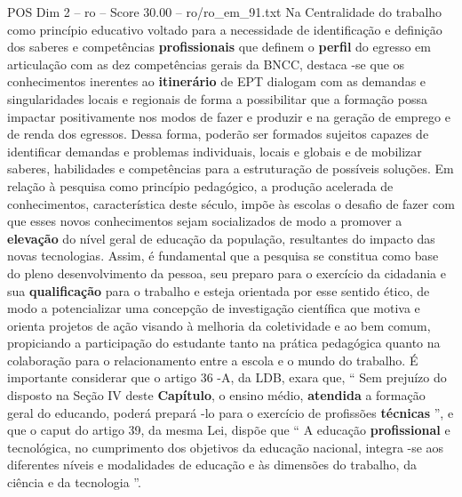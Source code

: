 \begin{textsample}{POS Dim 2 – ro – Score 30.00 – ro/ro\_em\_91.txt}
Na Centralidade do trabalho como princípio educativo voltado para a necessidade de identificação e definição dos saberes e competências \textbf{profissionais} que definem o \textbf{perfil} do egresso em articulação com as dez competências gerais da BNCC, destaca -se que os conhecimentos inerentes ao \textbf{itinerário} de EPT dialogam com as demandas e singularidades locais e regionais de forma a possibilitar que a formação possa impactar positivamente nos modos de fazer e produzir e na geração de emprego e de renda dos egressos.
Dessa forma, poderão ser formados sujeitos capazes de identificar demandas e problemas individuais, locais e globais e de mobilizar saberes, habilidades e competências para a estruturação de possíveis soluções.
Em relação à pesquisa como princípio pedagógico, a produção acelerada de conhecimentos, característica deste século, impõe às escolas o desafio de fazer com que esses novos conhecimentos sejam socializados de modo a promover a \textbf{elevação} do nível geral de educação da população, resultantes do impacto das novas tecnologias.
Assim, é fundamental que a pesquisa se constitua como base do pleno desenvolvimento da pessoa, seu preparo para o exercício da cidadania e sua \textbf{qualificação} para o trabalho e esteja orientada por esse sentido ético, de modo a potencializar uma concepção de investigação científica que motiva e orienta projetos de ação visando à melhoria da coletividade e ao bem comum, propiciando a participação do estudante tanto na prática pedagógica quanto na colaboração para o relacionamento entre a escola e o mundo do trabalho.
É importante considerar que o artigo 36 -A, da LDB, exara que, “ Sem prejuízo do disposto na Seção IV deste \textbf{Capítulo}, o ensino médio, \textbf{atendida} a formação geral do educando, poderá prepará -lo para o exercício de profissões \textbf{técnicas} ”, e que o caput do artigo 39, da mesma Lei, dispõe que “ A educação \textbf{profissional} e tecnológica, no cumprimento dos objetivos da educação nacional, integra -se aos diferentes níveis e modalidades de educação e às dimensões do trabalho, da ciência e da tecnologia ”.

\end{textsample}
